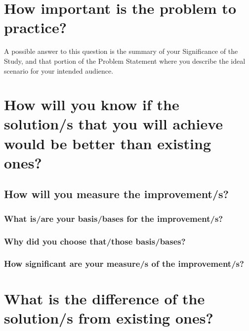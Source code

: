 


\section*{How important is the problem to practice?}

A possible answer to this question is the summary of your Significance of the Study, and that portion of the Problem Statement where you describe the ideal scenario for your intended audience. 

\textcolor[rgb]{0.75,0.75,0.75}{\blindtext}
	
	
	
	
\section*{How will you know if the solution/s that you will achieve would be better than existing ones?}	

\textcolor[rgb]{0.75,0.75,0.75}{\blindtext}


\subsection*{How will you measure the improvement/s?}	

\textcolor[rgb]{0.75,0.75,0.75}{\blindtext}

	
\subsubsection*{What is/are your basis/bases for the improvement/s?}

\textcolor[rgb]{0.75,0.75,0.75}{\blindtext}
	
		
\subsubsection*{Why did you choose that/those basis/bases?}

\textcolor[rgb]{0.75,0.75,0.75}{\blindtext}

				
\subsubsection*{How significant are your measure/s of the improvement/s?}

\textcolor[rgb]{0.75,0.75,0.75}{\blindtext}






	
\section*{What is the difference of the solution/s from existing ones?}
	
